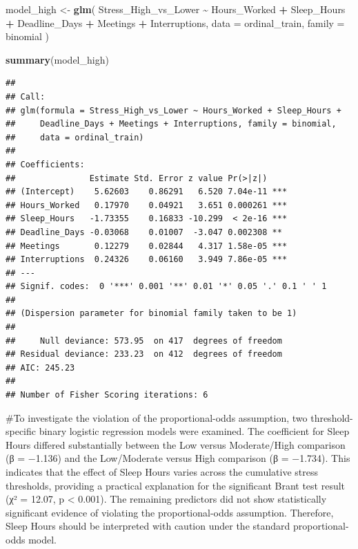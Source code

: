 \documentclass[
]{article}
\newenvironment{Shaded}{\begin{snugshade}}{\end{snugshade}}
\newcommand{\AttributeTok}[1]{\textcolor[rgb]{0.13,0.29,0.53}{#1}}
\newcommand{\FunctionTok}[1]{\textcolor[rgb]{0.13,0.29,0.53}{\textbf{#1}}}
\newcommand{\NormalTok}[1]{#1}
\newcommand{\OtherTok}[1]{\textcolor[rgb]{0.56,0.35,0.01}{#1}}
\newcommand{\SpecialCharTok}[1]{\textcolor[rgb]{0.81,0.36,0.00}{\textbf{#1}}}
\begin{document}
\begin{Shaded}
\begin{Highlighting}[]
\NormalTok{model\_high }\OtherTok{\textless{}{-}} \FunctionTok{glm}\NormalTok{(}
\NormalTok{  Stress\_High\_vs\_Lower }\SpecialCharTok{\textasciitilde{}}\NormalTok{ Hours\_Worked }\SpecialCharTok{+}\NormalTok{ Sleep\_Hours }\SpecialCharTok{+}
\NormalTok{    Deadline\_Days }\SpecialCharTok{+}\NormalTok{ Meetings }\SpecialCharTok{+}\NormalTok{ Interruptions,}
  \AttributeTok{data =}\NormalTok{ ordinal\_train,}
  \AttributeTok{family =}\NormalTok{ binomial}
\NormalTok{)}

\FunctionTok{summary}\NormalTok{(model\_high)}
\end{Highlighting}
\end{Shaded}

\begin{verbatim}
## 
## Call:
## glm(formula = Stress_High_vs_Lower ~ Hours_Worked + Sleep_Hours + 
##     Deadline_Days + Meetings + Interruptions, family = binomial, 
##     data = ordinal_train)
## 
## Coefficients:
##               Estimate Std. Error z value Pr(>|z|)    
## (Intercept)    5.62603    0.86291   6.520 7.04e-11 ***
## Hours_Worked   0.17970    0.04921   3.651 0.000261 ***
## Sleep_Hours   -1.73355    0.16833 -10.299  < 2e-16 ***
## Deadline_Days -0.03068    0.01007  -3.047 0.002308 ** 
## Meetings       0.12279    0.02844   4.317 1.58e-05 ***
## Interruptions  0.24326    0.06160   3.949 7.86e-05 ***
## ---
## Signif. codes:  0 '***' 0.001 '**' 0.01 '*' 0.05 '.' 0.1 ' ' 1
## 
## (Dispersion parameter for binomial family taken to be 1)
## 
##     Null deviance: 573.95  on 417  degrees of freedom
## Residual deviance: 233.23  on 412  degrees of freedom
## AIC: 245.23
## 
## Number of Fisher Scoring iterations: 6
\end{verbatim}

\#To investigate the violation of the proportional-odds assumption, two
threshold-specific binary logistic regression models were examined. The
coefficient for Sleep Hours differed substantially between the Low
versus Moderate/High comparison (β = −1.136) and the Low/Moderate versus
High comparison (β = −1.734). This indicates that the effect of Sleep
Hours varies across the cumulative stress thresholds, providing a
practical explanation for the significant Brant test result (χ² = 12.07,
p \textless{} 0.001). The remaining predictors did not show
statistically significant evidence of violating the proportional-odds
assumption. Therefore, Sleep Hours should be interpreted with caution
under the standard proportional-odds model.
\end{document}
